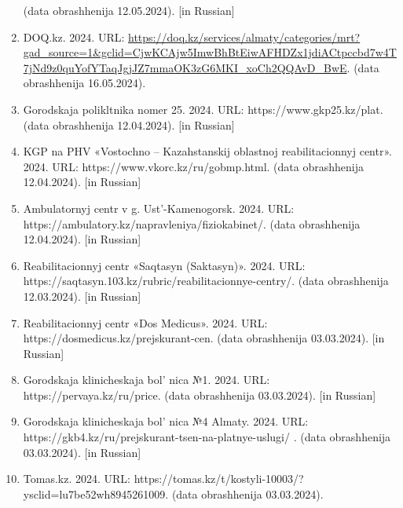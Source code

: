 \begin{references}
\begin{enumerate}
  (data obrashhenija 12.05.2024). {[}in Russian{]}
\item
  DOQ.kz. 2024. URL:
  \url{https://doq.kz/services/almaty/categories/mrt?gad_source=1&gclid=CjwKCAjw5ImwBhBtEiwAFHDZx1jdiACtpccbd7w4T7jNd9z0quYofYTaqJgjJZ7mmaOK3zG6MKI_xoCh2QQAvD_BwE}.
  (data obrashhenija 16.05.2024).
\item
  Gorodskaja polikltnika nomer 25. 2024. URL: https://www.gkp25.kz/plat.
  (data obrashhenija 12.04.2024). {[}in Russian{]}
\item
  KGP na PHV «Vostochno -- Kazahstanskij oblastnoj reabilitacionnyj
  centr». 2024. URL: https://www.vkorc.kz/ru/gobmp.html. (data
  obrashhenija 12.04.2024). {[}in Russian{]}
\item
  Ambulatornyj centr v g. Ust'-Kamenogorsk. 2024. URL:
  https://ambulatory.kz/napravleniya/fiziokabinet/. (data obrashhenija
  12.04.2024). {[}in Russian{]}
\item
  Reabilitacionnyj centr «Saqtasyn (Saktasyn)». 2024. URL:
  https://saqtasyn.103.kz/rubric/reabilitacionnye-centry/. (data
  obrashhenija 12.03.2024). {[}in Russian{]}
\item
  Reabilitacionnyj centr «Dos Medicus». 2024. URL:
  https://dosmedicus.kz/prejskurant-cen. (data obrashhenija 03.03.2024).
  {[}in Russian{]}
\item
  Gorodskaja klinicheskaja bol' nica №1. 2024. URL:
  https://pervaya.kz/ru/price. (data obrashhenija 03.03.2024). {[}in
  Russian{]}
\item
  Gorodskaja klinicheskaja bol' nica №4 Almaty. 2024.
  URL: https://gkb4.kz/ru/prejskurant-tsen-na-platnye-uslugi/ . (data
  obrashhenija 03.03.2024). {[}in Russian{]}
\item
  Tomas.kz. 2024. URL:
  https://tomas.kz/t/kostyli-10003/?ysclid=lu7be52wh8945261009. (data
  obrashhenija 03.03.2024).
\end{enumerate}
\end{references}
